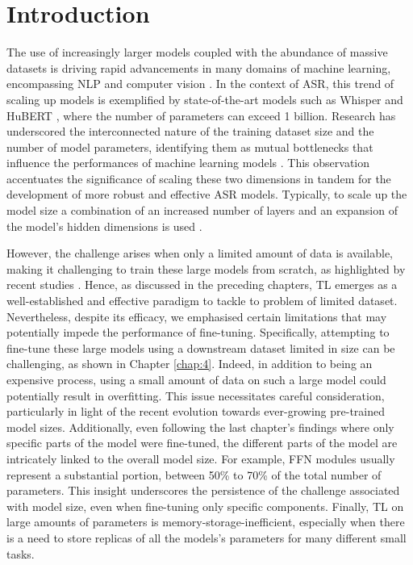 \label{chap:5}
\cleardoublepage

\section{Introduction}
The use of increasingly larger models coupled with the abundance of massive datasets is driving rapid advancements in many domains of machine learning, encompassing \ac{NLP} \cite{brown2020language} and computer vision \cite{ramesh2021zero}. In the context of \ac{ASR}, this trend of scaling up models is exemplified by state-of-the-art models such as Whisper \cite{radford2023robust} and HuBERT \cite{hsu2021hubert}, where the number of parameters can exceed 1 billion. Research has underscored the interconnected nature of the training dataset size and the number of model parameters, identifying them as mutual bottlenecks that influence the performances of machine learning models \cite{Kaplan2020ScalingLF}. This observation accentuates the significance of scaling these two dimensions in tandem for the development of more robust and effective \ac{ASR} models. Typically, to scale up the model size a combination of an increased number of layers and an expansion of the model's hidden dimensions is used \cite{zheng22d_interspeech}.

However, the challenge arises when only a limited amount of data is available, making it challenging to train these large models from scratch, as highlighted by recent studies \cite{sri_end2end, gelin2021endtoend}. Hence, as discussed in the preceding chapters, \ac{TL} emerges as a well-established and effective paradigm to tackle to problem of limited dataset. Nevertheless, despite its efficacy, we emphasised certain limitations that may potentially impede the performance of fine-tuning. Specifically, attempting to fine-tune these large models using a downstream dataset limited in size can be challenging, as shown in Chapter \ref{chap:4}. Indeed, in addition to being an expensive process, using a small amount of data on such a large model could potentially result in overfitting. This issue necessitates careful consideration, particularly in light of the recent evolution towards ever-growing pre-trained model sizes. Additionally, even following the last chapter's findings where only specific parts of the model were fine-tuned, the different parts of the model are intricately linked to the overall model size. For example, \ac{FFN} modules usually represent a substantial portion, between 50\% to  70\% of the total number of parameters. This insight underscores the persistence of the challenge associated with model size, even when fine-tuning only specific components. Finally, \ac{TL} on large amounts of parameters is memory-storage-inefficient, especially when there is a need to store replicas of all the models's parameters for many different small tasks.

